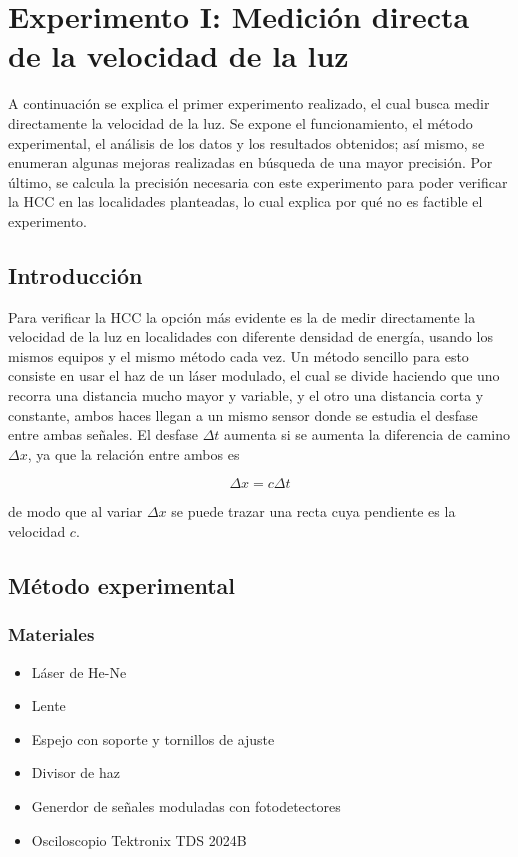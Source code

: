 \chapter{Experimento I: Medición directa de la velocidad de la luz}
 
 A continuación se explica el primer experimento realizado, el cual busca medir directamente la velocidad de la luz. Se expone el funcionamiento, el método experimental, el análisis de los datos y los resultados obtenidos; así mismo, se enumeran algunas mejoras realizadas en búsqueda de una mayor precisión. Por último, se calcula la precisión necesaria con este experimento para poder verificar la \ac{HCC} en las localidades planteadas, lo cual explica por qué no es factible el experimento.
 

\section{Introducción}
Para verificar la \ac{HCC} la opción más evidente es la de medir directamente la velocidad de la luz en localidades con diferente densidad de energía, usando los mismos equipos y el mismo método cada vez. Un método sencillo para esto consiste en usar el haz de un láser modulado, el cual se divide haciendo que uno recorra una distancia mucho mayor y variable, y el otro una distancia corta y constante, ambos haces llegan a un mismo sensor donde se estudia el desfase entre ambas señales. El desfase $\Delta t$ aumenta si se aumenta la diferencia de camino $\Delta x$, ya que la relación entre ambos es

\begin{equation} \label{pendiente_c}
    \Delta x = c \Delta t
\end{equation}

de modo que al variar $\Delta x$ se puede trazar una recta cuya pendiente es la velocidad $c$.


\section{Método experimental}

\subsection{Materiales}

\begin{itemize}
    \item Láser de He-Ne
    \item Lente
    \item Espejo con soporte y tornillos de ajuste
    \item Divisor de haz
    \item Generdor de señales moduladas con fotodetectores
    \item Osciloscopio Tektronix TDS 2024B 
\end{itemize}

